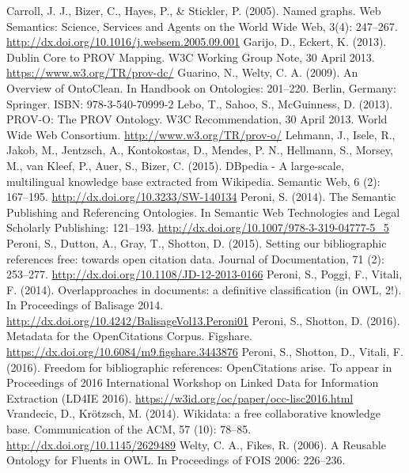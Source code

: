 \documentclass[runningheads,a4paper]{llncs}
\begin{document}
\begin{thebibliography}{4}

 Carroll, J. J., Bizer, C., Hayes, P., \& Stickler, P. (2005). Named graphs. Web Semantics: Science, Services and Agents on the World Wide Web, 3(4): 247--267. \url{http://dx.doi.org/10.1016/j.websem.2005.09.001}
 Garijo, D., Eckert, K. (2013). Dublin Core to PROV Mapping. W3C Working Group Note, 30 April 2013. \url{https://www.w3.org/TR/prov-dc/}
 Guarino, N., Welty, C. A. (2009). An Overview of OntoClean. In Handbook on Ontologies: 201--220. Berlin, Germany: Springer. ISBN: 978-3-540-70999-2
 Lebo, T., Sahoo, S., McGuinness, D. (2013). PROV-O: The PROV Ontology. W3C Recommendation, 30 April 2013. World Wide Web Consortium. \url{http://www.w3.org/TR/prov-o/}
 Lehmann, J., Isele, R., Jakob, M., Jentzsch, A., Kontokostas, D., Mendes, P. N., Hellmann, S., Morsey, M., van Kleef, P., Auer, S., Bizer, C. (2015). DBpedia - A large-scale, multilingual knowledge base extracted from Wikipedia. Semantic Web, 6 (2): 167--195. \url{http://dx.doi.org/10.3233/SW-140134}
 Peroni, S. (2014). The Semantic Publishing and Referencing Ontologies. In Semantic Web Technologies and Legal Scholarly Publishing: 121--193. \url{http://dx.doi.org/10.1007/978-3-319-04777-5\_5}
 Peroni, S., Dutton, A., Gray, T., Shotton, D. (2015). Setting our bibliographic references free: towards open citation data. Journal of Documentation, 71 (2): 253--277. \url{http://dx.doi.org/10.1108/JD-12-2013-0166}
 Peroni, S., Poggi, F., Vitali, F. (2014). Overlapproaches in documents: a definitive classification (in OWL, 2!). In Proceedings of Balisage 2014. \url{http://dx.doi.org/10.4242/BalisageVol13.Peroni01}
 Peroni, S., Shotton, D. (2016). Metadata for the OpenCitations Corpus. Figshare. \url{https://dx.doi.org/10.6084/m9.figshare.3443876}
 Peroni, S., Shotton, D., Vitali, F. (2016). Freedom for bibliographic references: OpenCitations arise. To appear in Proceedings of 2016 International Workshop on Linked Data for Information Extraction (LD4IE 2016). \url{https://w3id.org/oc/paper/occ-lisc2016.html}
 Vrandecic, D., Krötzsch, M. (2014). Wikidata: a free collaborative knowledge base. Communication of the ACM, 57 (10): 78--85. \url{http://dx.doi.org/10.1145/2629489}
 Welty, C. A., Fikes, R. (2006). A Reusable Ontology for Fluents in OWL. In Proceedings of FOIS 2006: 226--236.

\end{thebibliography}
\end{document}
